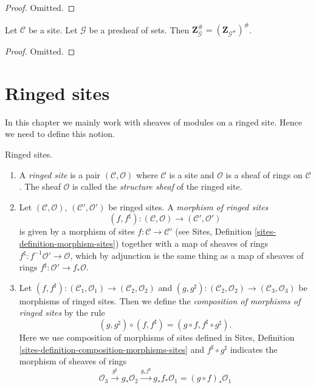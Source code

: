 \begin{proof}
Omitted.
\end{proof}

\begin{lemma}
\label{lemma-may-sheafify-before-abelianize}
Let $\mathcal{C}$ be a site.
Let $\mathcal{G}$ be a presheaf of sets.
Then $\mathbf{Z}_\mathcal{G}^\# = (\mathbf{Z}_{\mathcal{G}^\#})^\#$.
\end{lemma}

\begin{proof}
Omitted.
\end{proof}








\section{Ringed sites}
\label{section-ringed-sites}

\noindent
In this chapter we mainly work with sheaves of modules on a ringed site.
Hence we need to define this notion.

\begin{definition}
\label{definition-ringed-site}
Ringed sites.
\begin{enumerate}
\item A {\it ringed site} is a pair $(\mathcal{C}, \mathcal{O})$
where $\mathcal{C}$ is a site and $\mathcal{O}$ is a sheaf of rings
on $\mathcal{C}$. The sheaf $\mathcal{O}$ is called the
{\it structure sheaf} of the ringed site.
\item Let $(\mathcal{C}, \mathcal{O})$, $(\mathcal{C}', \mathcal{O}')$ be ringed
sites. A {\it morphism of ringed sites}
$$
(f, f^\sharp) :
(\mathcal{C}, \mathcal{O})
\longrightarrow
(\mathcal{C}', \mathcal{O}')
$$
is given by a morphism of sites $f : \mathcal{C} \to \mathcal{C}'$
(see Sites, Definition \ref{sites-definition-morphism-sites})
together with a map of sheaves of rings
$f^\sharp : f^{-1}\mathcal{O}' \to \mathcal{O}$, which by adjunction
is the same thing as a map of sheaves of rings
$f^\sharp : \mathcal{O}' \to f_*\mathcal{O}$.
\item Let
$(f, f^\sharp) :
(\mathcal{C}_1, \mathcal{O}_1) \to (\mathcal{C}_2, \mathcal{O}_2)$ and
$(g, g^\sharp) :
(\mathcal{C}_2, \mathcal{O}_2) \to (\mathcal{C}_3, \mathcal{O}_3)$
be morphisms of ringed sites. Then we define
the {\it composition of morphisms of ringed sites}
by the rule
$$
(g, g^\sharp) \circ (f, f^\sharp) = (g \circ f, f^\sharp \circ g^\sharp).
$$
Here we use composition of morphisms of sites defined in
Sites, Definition \ref{sites-definition-composition-morphisms-sites}
and $f^\sharp \circ g^\sharp$ indicates the morphism of sheaves of
rings
$$
\mathcal{O}_3 \xrightarrow{g^\sharp} g_*\mathcal{O}_2
\xrightarrow{g_*f^\sharp} g_*f_*\mathcal{O}_1 = (g \circ f)_*\mathcal{O}_1
$$
\end{enumerate}
\end{definition}






